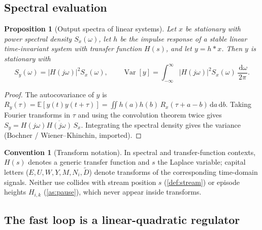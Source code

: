 \documentclass[11pt, a4paper]{article}
\theoremstyle{definition}
\newtheorem{convention}{Convention}[section]
\theoremstyle{plain}
\newtheorem{proposition}[theorem]{Proposition}
\theoremstyle{remark}
\newcommand{\E}{\mathbb{E}}
\newcommand{\Var}{\operatorname{Var}}
\newcommand{\dd}{\,\mathrm{d}}
\begin{document}
\subsection{Spectral evaluation}\label{sec:spectral}

\begin{proposition}[Output spectra of linear systems]\label{prop:psd}
Let $x$ be stationary with power spectral density $S_x(\omega)$, let $h$
be the impulse response of a stable linear time-invariant system with
transfer function $H(s)$, and let $y = h * x$.  Then $y$ is stationary
with
\begin{equation}\label{eq:psd-rule}
  S_y(\omega) = \bigl|H(j\omega)\bigr|^2 S_x(\omega),
  \qquad
  \Var[y] = \int_{-\infty}^{\infty} |H(j\omega)|^2 S_x(\omega)
  \,\frac{\dd\omega}{2\pi}.
\end{equation}
\end{proposition}

\begin{proof}
The autocovariance of $y$ is
$R_y(\tau) = \E[y(t)y(t{+}\tau)]
= \iint h(a)h(b)\,R_x(\tau + a - b)\dd a\dd b$.
Taking Fourier transforms in $\tau$ and using the convolution theorem
twice gives $S_y = H(j\omega)\overline{H(j\omega)}\,S_x$.  Integrating
the spectral density gives the variance (Bochner / Wiener--Khinchin,
imported).
\end{proof}

\begin{convention}[Transform notation]\label{conv:transforms}
In spectral and transfer-function contexts, $H(s)$ denotes a generic
transfer function and $s$ the Laplace variable; capital letters
($E, U, W, Y, M, N_i, \tilde D$) denote transforms of the
corresponding time-domain signals.  Neither use collides with stream
position $s$ (\cref{def:stream}) or episode heights $H_{i,k}$
(\cref{as:pause}), which never appear inside transforms.
\end{convention}

\subsection{The fast loop is a linear-quadratic regulator}\label{sec:lqr}
\end{document}
